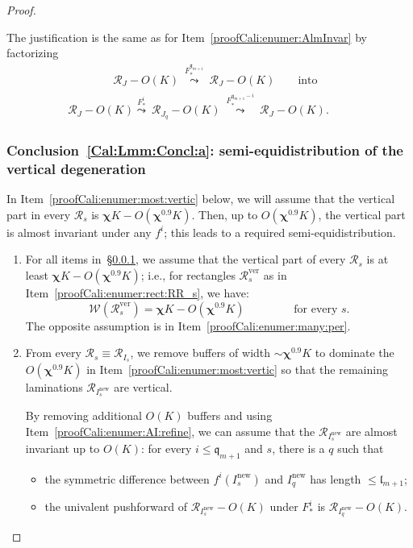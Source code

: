 \documentclass{amsart}
\newcommand{\1}{{\mathbb 1 }}
\newcommand{\Width}{{\mathcal W}}
\newcommand\RR{\mathcal{R}}
\newcommand{\qq}{\mathfrak{q}}
\newcommand{\length}{{\mathfrak l}}
\newcommand\new{{\operatorname{new}}}
\newcommand\ver{{\operatorname{ver}}}
\theoremstyle{remark}
\numberwithin{equation}{section}
\theoremstyle{definition}
\newcommand{\bchi}{{\boldsymbol{ \chi}}}
\begin{document}
\begin{proof}
\begin{enumerate}[label=\text{(\arabic*)},font=\normalfont,leftmargin=*,start=8]
\noindent The justification is the same as for Item~\ref{proofCali:enumer:AlmInvar} by factorizing 
\begin{multline*}
\qquad\qquad  \RR_J-O(K)\ \overset{F^{\qq_{m+1}}_*}\leadsto\  \RR_J-O(K) \qquad \text{into}\\ \RR_J-O(K)  \overset{F^{i}_*}\leadsto\  \RR_{J_q}-O(K) \ \overset{F^{\qq_{m+1}-i}_*}\leadsto\   \RR_J-O(K). \qquad 
\end{multline*} 
\end{enumerate}



\subsubsection{Conclusion~\ref{Cal:Lmm:Concl:a}: semi-equidistribution of the vertical degeneration}\label{sss:prf:CL:semi:Equid} In Item~\ref{proofCali:enumer:most:vertic} below, we will assume that the vertical part in every $\RR_s$ is $\bchi K-O(\bchi^{0.9} K)$.  Then, up to $O(\bchi^{0.9} K)$, the vertical part is almost invariant under any $f^i$; this leads to a required semi-equidistribution. 

\begin{enumerate}[label=\text{(\arabic*)},font=\normalfont,leftmargin=*,start=13]
  
 \item \label{proofCali:enumer:most:vertic} For all items in~\S\ref{sss:prf:CL:semi:Equid}, we assume that the vertical part of every $\RR_s$ is at least $\bchi K-O(\bchi^{0.9} K)$; i.e., for rectangles $\RR^\ver_s$ as in Item~\ref{proofCali:enumer:rect:RR_s}, we have:
 \[\Width(\RR^\ver_s)= \bchi K-O(\bchi^{0.9} K)\qquad\qquad \text{ for every $s$}.\]
The opposite assumption is in Item~\ref{proofCali:enumer:many:per}.

\item \label{proofCali:enumer:most:vertic:2} From every $\RR_s\equiv \RR_{I_s}$, we remove buffers of width $\sim \bchi^{0.9}K$ to dominate the $O(\bchi^{0.9}K)$ in Item~\ref{proofCali:enumer:most:vertic} so that the remaining laminations $\RR_{I_s^\new}$ are vertical. 

\noindent By removing additional $O(K)$ buffers and using Item~\ref{proofCali:enumer:AI:refine}, we can assume that the $\RR_{I^\new_s}$ are almost invariant up to $O(K)$: for every $i\le \qq_{m+1}$ and $s$, there is a $q$ such that
\begin{itemize}
    \item the symmetric difference between $f^{i}(I^\new_s)$ and $I_q^\new$ has length $\le \length_{m+1}$;
    \item the univalent pushforward of $\RR_{I_s^\new}-O(K)$ under $F^i_*$ is $\RR_{I_q^\new}-O(K)$.
\end{itemize}


\end{enumerate}
\end{proof}
\end{document}
